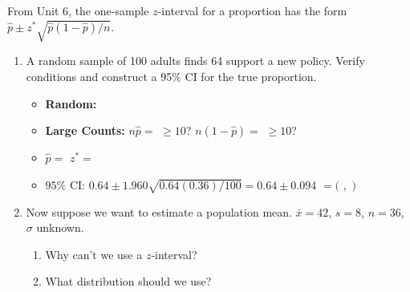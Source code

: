 \documentclass[10pt]{article}
\begin{document}
\namedateperiod

\vspace{0.15in}

From Unit 6, the one-sample $z$-interval for a proportion has the form
$\hat p \pm z^* \sqrt{\hat p(1 - \hat p)/n}$.

\begin{enumerate}
  \item A random sample of 100 adults finds 64 support a new policy. Verify
        conditions and construct a 95\% CI for the true proportion.

        \begin{itemize}
          \item \textbf{Random:} 
          \item \textbf{Large Counts:} $n\hat p = $ $ \ge 10$? 
                \quad $n(1-\hat p) = $ $ \ge 10$? 
          \item $\hat p = $  \quad $z^* = $ 
          \item $95\%$ CI: $0.64 \pm 1.960\sqrt{0.64(0.36)/100} = 0.64 \pm 0.094$
                $= ($  $,$  $)$
        \end{itemize}

  \item Now suppose we want to estimate a population mean. $\bar x = 42$,
        $s = 8$, $n = 36$, $\sigma$ unknown.

        \begin{enumerate}[label=\alph*.]
          \item Why can't we use a $z$-interval?

          \item What distribution should we use?
        \end{enumerate}
\end{enumerate}
\end{document}
